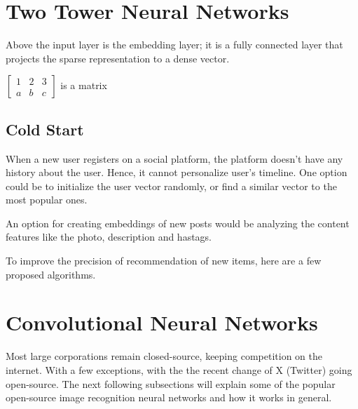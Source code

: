 \section{Two Tower Neural Networks} \label{nn}

Above the input layer is the embedding layer; it is a fully
connected layer that projects the sparse representation to
a dense vector.  \cite{10.1145/3038912.3052569} \cite{DBLP:journals/corr/abs-1708-05027}    

$\begin{bmatrix}
1 & 2 & 3\\
a & b & c
\end{bmatrix} $ is a matrix

\subsection{Cold Start}\label{cold-start}

When a new user registers on a social platform, the platform doesn't have any history about the user. Hence, it cannot personalize user's timeline. One option could be to initialize the user vector randomly, or find a similar vector to the most popular ones.

An option for creating embeddings of new posts would be analyzing the content features like the photo, description and hastags.

To improve the precision of recommendation of new items, here are a few proposed algorithms. 

\begin{comment}
\noindent\rule{2cm}{0.4pt}

aTwo tower neural network architecture 
User embedding
Post embedding
embedding = vector
normalize vector
dot product of post and user vector
pre trained embeddings

\noindent\rule{2cm}{0.4pt}
\end{comment}

\section{Convolutional Neural Networks}\label{cnn}

Most large corporations remain closed-source, keeping competition on the internet. With a few exceptions, with the the recent change of X (Twitter) going open-source. The next following subsections will explain some of the popular open-source image recognition neural networks and how it works in general.


\begin{comment}







RAPID NET

\end{comment}